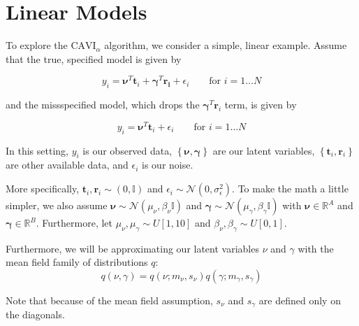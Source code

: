 \documentclass[letterpaper,12pt]{article}
\newcommand{\R}{\mathbb{R}} %
\newcommand{\lc}{\left \{} %
\newcommand{\rc}{\right \}} %
\newcommand{\sigmaepsilon}{\sigma_\epsilon^2} %
\newcommand{\nuv}{\boldsymbol{\nu}} %
\newcommand{\gammav}{\boldsymbol{\gamma}} %
\newcommand{\ti}{\boldsymbol{t}_i} %
\newcommand{\ri}{\boldsymbol{r}_i} %
\newcommand{\cavi}{\ensuremath{\mathrm{CAVI}}}
\begin{document}
\section{Linear Models}
To explore the $\cavi_\alpha$ algorithm, we consider a simple, linear example. Assume that the true, specified model is given by

\begin{equation}
    y_i=\mathbf{\nu}^T\mathbf{t}_i+\mathbf{\gamma}^T \mathbf{r_i}+\epsilon_i \qquad \text{for }i=1\ldots N 
\end{equation}

and the missspecified model, which drops the $\gammav^T \ri$ term, is given by

\begin{equation}
    y_i=\mathbf{\nu}^T\mathbf{t}_i+\epsilon_i \qquad \text{for }i=1\ldots N 
\end{equation}

In this setting, $y_i$ is our observed data, $\lc \nuv, \gammav \rc$ are our latent variables, $\lc \ti, \ri \rc$ are other available data, and $\epsilon_i$ is our noise.

More specifically, $\ti, \ri \sim (0, \mathbb{I})$ and $\epsilon_i \sim \mathcal{N}(0, \sigmaepsilon)$. To make the math a little simpler, we also assume $\nuv \sim \mathcal{N}(\mu_{\nu}, \beta_\nu \mathbb{I})$ and $\gammav \sim \mathcal{N}(\mu_{\gamma}, \beta_\gamma \mathbb{I})$ with $\nuv \in \R^A$ and $\gammav \in \R^B$. Furthermore, let $\mu_\nu, \mu_\gamma \sim U[1,10]$ and $\beta_\nu, \beta_\gamma \sim U[0,1]$.


Furthermore, we will be approximating our latent variables $\nu$ and $\gamma$ with the mean field family of distributions $q$:
\begin{equation}
    q(\nu, \gamma) = q(\nu; m_\nu, s_\nu)q(\gamma; m_\gamma, s_\gamma)
\end{equation}

Note that because of the mean field assumption, $s_\nu$ and $s_\gamma$ are defined only on the diagonals.
\end{document}
